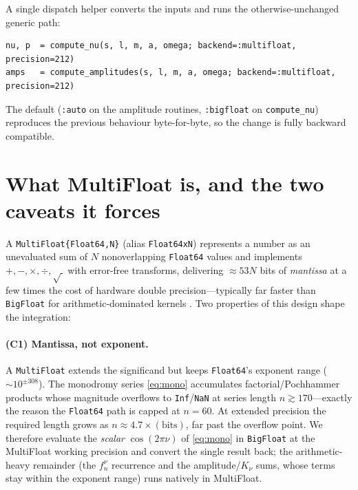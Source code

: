 \documentclass[11pt]{article}
\begin{document}
A single dispatch helper converts the inputs and runs the otherwise-unchanged
generic path:

\begin{lstlisting}
nu, p  = compute_nu(s, l, m, a, omega; backend=:multifloat, precision=212)
amps   = compute_amplitudes(s, l, m, a, omega; backend=:multifloat, precision=212)
\end{lstlisting}

The default (\texttt{:auto} on the amplitude routines, \texttt{:bigfloat} on
\texttt{compute\_nu}) reproduces the previous behaviour byte-for-byte, so the
change is fully backward compatible.

\section{What MultiFloat is, and the two caveats it forces}

A \texttt{MultiFloat\{Float64,N\}} (alias \texttt{Float64xN}) represents a number
as an unevaluated sum of $N$ nonoverlapping \texttt{Float64} values and
implements $+,-,\times,\div,\sqrt{\,}$ with error-free transforms, delivering
$\approx 53N$ bits of \emph{mantissa} at a few times the cost of hardware
double precision---typically far faster than \texttt{BigFloat} for
arithmetic-dominated kernels \cite{MultiFloats}. Two properties of this design
shape the integration:

\paragraph{(C1) Mantissa, not exponent.} A \texttt{MultiFloat} extends the
significand but keeps \texttt{Float64}'s exponent range
($\sim 10^{\pm 308}$). The monodromy series \eqref{eq:mono} accumulates
factorial/Pochhammer products whose magnitude overflows to \texttt{Inf}/\texttt{NaN}
at series length $n\gtrsim 170$---exactly the reason the \texttt{Float64} path is
capped at $n=60$. At extended precision the required length grows as
$n\approx 4.7\times(\text{bits})$, far past the overflow point. We therefore
evaluate the \emph{scalar} $\cos(2\pi\nu)$ of \eqref{eq:mono} in \texttt{BigFloat}
at the MultiFloat working precision and convert the single result back; the
arithmetic-heavy remainder (the $f^\nu_n$ recurrence and the amplitude/$K_\nu$
sums, whose terms stay within the exponent range) runs natively in MultiFloat.
\end{document}
